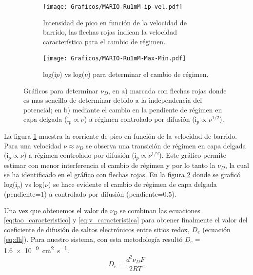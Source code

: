          	 \begin{figure}[ht]
			 	 \begin{subfigure}[t]{0.5\textwidth}
			 	 \texttt{[image: Graficos/MARIO-Ru1mM-ip-vel.pdf]}
				  \caption{Intensidad de pico  en función de la velocidad de barrido, las flechas rojas indican la velocidad característica para el cambio de régimen.}
			 	 \label{fig:ip-vel}
		  	  	 \end{subfigure}	
			 	 \begin{subfigure}[t]{0.5\textwidth}
			  	 \texttt{[image: Graficos/MARIO-Ru1mM-Max-Min.pdf]}
			  	 \caption{log(i$p$) vs log($\nu$) para determinar el cambio de régimen.}
			 	 \label{fig:logj-logv}
		  		 \end{subfigure}
				  \caption[Calculo de velocidad de barrido característica]{Gráficos para determinar $\nu_{\scriptscriptstyle{D}}$, en a) marcada con flechas rojas donde es mas sencillo de determinar debido a la independencia del potencial; en b) mediante el cambio en la pendiente de  régimen en capa delgada ($\text{i}_{p} \propto \nu$) a régimen controlado por difusión ($\text{i}_{p} \propto \nu^{1/2}$).}
			 	 \label{fig:ip-vel2}
			 	 \end{figure}

         La figura \ref{fig:ip-vel} muestra la corriente de pico en función de la velocidad de barrido. Para una velocidad $\nu \approx \nu_{\scriptscriptstyle{D}}$ se observa una transición de régimen en capa delgada ($\text{i}_{p} \propto \nu$) a régimen controlado por difusión ($\text{i}_{p} \propto \nu^{1/2}$). Este gráfico permite estimar con menor interferencia el cambio de régimen y por lo tanto la $\nu_{\scriptscriptstyle{D}}$, la cual se ha identificado en el gráfico con flechas rojas. En la figura \ref{fig:logj-logv} donde se graficó log({i$_p$}) vs log({$\nu$}) se hace evidente el cambio de régimen de capa delgada (pendiente=1) a controlado por difusión (pendiente=0.5).

		 Una vez que obtenemos el valor de  $\nu_{\scriptscriptstyle{D}}$ se combinan las ecuaciones \ref{eq:tao_caracteristico} y \ref{eq:v_caracteristica} para obtener finalmente el valor del coeficiente de difusión de saltos electrónicos entre sitios redox,  $D_e$ (ecuación \ref{eq:dh}). Para nuestro sistema, con esta metodología resultó $D_e=$\SI{1.6e-9}{\square\cm\per\second}.  
			\begin{equation}
					D_e= \frac{d^2\nu_{\scriptscriptstyle{D}}F}{2RT}
					\label{eq:dh}
			\end{equation}
     
